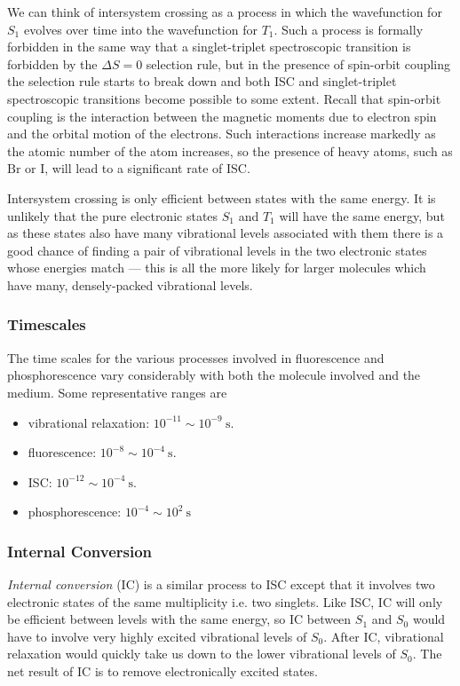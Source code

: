 \documentclass{article}
\theoremstyle{plain}\theoremheaderfont{\normalfont\itshape}\theorembodyfont{\rmfamily}\theoremseparator{.}\newtheorem*{rem}{Remark}\newtheorem*{ex}{Example}\newtheorem*{proof}{Proof}\newtheorem*{altp}{Alternative proof}
\theoremstyle{plain}\theoremheaderfont{\normalfont\bfseries}\theorembodyfont{\rmfamily}\theoremseparator{.}\newtheorem{thm}{Theorem}[section]\newtheorem{lem}[thm]{Lemma}\newtheorem{prop}[thm]{Proposition}\newtheorem*{cor}{Corollary}\newtheorem{defn}[thm]{Definition}\newtheorem{clm}[thm]{Claim}\newtheorem{clminproof}{Claim}\newtheorem{pos}{Postulate}[section]
\theoremstyle{break}\theoremheaderfont{\normalfont\itshape}\theorembodyfont{\rmfamily}\theoremseparator{.\medskip}\newtheorem*{proofskip}{Proof}\newtheorem*{exs}{Examples}\newtheorem*{rems}{Remarks}
\theoremstyle{break}\theoremheaderfont{\normalfont\bfseries}\theorembodyfont{\rmfamily}\theoremseparator{.\medskip}\newtheorem{lemskip}[thm]{Lemma}\newtheorem{defnskip}[thm]{Definition}\newtheorem{propskip}[thm]{Proposition}\newtheorem{thmskip}[thm]{Theorem}
\numberwithin{equation}{section}
\newcommand{\unit}[1]{\ \mathrm{#1}}
\begin{document}
    We can think of intersystem crossing as a process in which the wavefunction for \(S_1\) evolves over time into the wavefunction for \(T_1\). Such a process is formally forbidden in the same way that a singlet-triplet spectroscopic transition is forbidden by the \(\Delta S=0\) selection rule, but in the presence of spin-orbit coupling the selection rule starts to break down and both ISC and singlet-triplet spectroscopic transitions become possible to some extent. Recall that spin-orbit coupling is the interaction between the magnetic moments due to electron spin and the orbital motion of the electrons. Such interactions increase markedly as the atomic number of the atom increases, so the presence of heavy atoms, such as \(\mathrm{Br}\) or \(\mathrm{I}\), will lead to a significant rate of ISC.

    Intersystem crossing is only efficient between states with the same energy. It is unlikely that the pure electronic states \(S_1\) and \(T_1\) will have the same energy, but as these states also have many vibrational levels associated with them there is a good chance of finding a pair of vibrational levels in the two electronic states whose energies match --- this is all the more likely for larger molecules which have many, densely-packed vibrational levels.

    \subsubsection*{Timescales}
    The time scales for the various processes involved in fluorescence and phosphorescence vary considerably with both the molecule involved and the medium. Some representative ranges are
    \begin{itemize}[topsep=0pt]
        \item vibrational relaxation: \(10^{-11}\sim 10^{-9}\unit{s}\).
        \item fluorescence: \(10^{-8}\sim 10^{-4}\unit{s}\).
        \item ISC: \(10^{-12}\sim 10^{-4}\unit{s}\).
        \item phosphorescence: \(10^{-4}\sim 10^{2}\unit{s}\)
    \end{itemize}

    \subsubsection*{Internal Conversion}
    \textit{Internal conversion} (IC) is a similar process to ISC except that it involves two electronic states of the same multiplicity i.e. two singlets. Like ISC, IC will only be efficient between levels with the same energy, so IC between \(S_1\) and \(S_0\) would have to involve very highly excited vibrational levels of \(S_0\). After IC, vibrational relaxation would quickly take us down to the lower vibrational levels of \(S_0\). The net result of IC is to remove electronically excited states.
\end{document}
